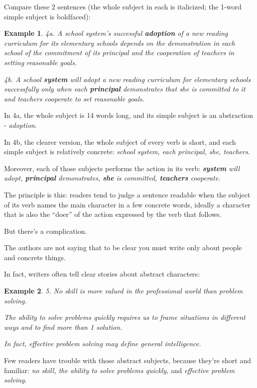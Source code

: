 \documentclass[oneside]{book}
\numberwithin{equation}{section}
\newtheorem{example}{Example}[section]
\begin{document}
Compare these 2 sentences (the whole subject in each is italicized; the 1-word simple subject is boldfaced):
\begin{example}
    4a. \emph{A school system's successful \textbf{adoption} of a new reading curriculum for its elementary schools} depends on the demonstration in each school of the commitment of its principal and the cooperation of teachers in setting reasonable goals.
    
    4b. \emph{A school \textbf{system}} will adopt a new reading curriculum for elementary schools successfully only when \emph{each \textbf{principal}} demonstrates that \emph{she} is committed to it and \emph{teachers} cooperate to set reasonable goals.
\end{example}
In 4a, the whole subject is 14 words long, and its simple subject is an abstraction - \textit{adoption}.

In 4b, the clearer version, the whole subject of every verb is short, and each simple subject is relatively concrete: \textit{school system, each principal, she, teachers}.

Moreover, each of those subjects performs the action in its verb: \textit{\textbf{system} will adopt, \textbf{principal} demonstrates, \textbf{she} is committed, \textbf{teachers} cooperate}.

%
The principle is this: readers tend to judge a sentence readable when the subject of its verb names the main character in a few concrete words, ideally a character that is also the ``doer'' of the action expressed by the verb that follows.

%
But there's a complication.

The authors are not saying that to be clear you must write only about people and concrete things.

In fact, writers often tell clear stories about abstract characters:
\begin{example}
    5. \emph{No skill} is more valued in the professional world than problem solving.
    
    \emph{The ability to solve problems quickly} requires us to frame situations in different ways and to find more than 1 solution.
    
    In fact, \textit{effective problem solving} may define general intelligence.
\end{example}
Few readers have trouble with those abstract subjects, because they're short and familiar: \textit{no skill, the ability to solve problems quickly}, and \textit{effective problem solving}.
\end{document}
